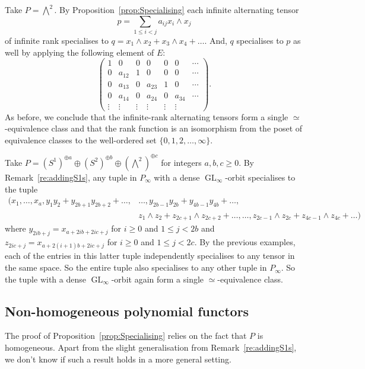 \documentclass{amsart}
\theoremstyle{plain}
\theoremstyle{definition}
\DeclareMathOperator{\GL}{GL}
\newcommand{\Wedge}{\bigwedge\nolimits}
\begin{document}
\begin{ex}\label{ex:AlternatingTensors}
Take $P=\Wedge^2$. By Proposition~\ref{prop:Specialising} each infinite alternating tensor
\[
p=\sum_{1 \leq i < j} a_{ij} x_i\land x_j
\]
of infinite rank specialises to $q=x_1\land x_2 + x_3\land x_4 + \ldots$. And, $q$ specialises to $p$ as well by applying the following element of $E$:
\[
\begin{pmatrix}
1 & 0 & 0 & 0      & 0 & 0 & \cdots\\
0 & a_{12} & 1 & 0 & 0 & 0 & \cdots\\
0 & a_{13} & 0 & a_{23} & 1 & 0 &\cdots\\
0 & a_{14} & 0 & a_{24} & 0 & a_{34} &\cdots\\
\vdots & \vdots & \vdots & \vdots & \vdots & \vdots &
\end{pmatrix}.
\]
As before, we conclude that the infinite-rank alternating
tensors form a single $\simeq$-equivalence class and that the rank function is an isomorphism from the poset of equivalence classes to the well-ordered set $\{0,1,2,\ldots,\infty\}$.
\end{ex}

\begin{ex}\label{ex:degreeleq2}
Take $P=(S^1)^{\oplus a}\oplus (S^2)^{\oplus b}\oplus (\Wedge^2)^{\oplus c}$ for integers $a,b,c\geq0$. By Remark~\ref{re:addingS1s}, any tuple in $P_{\infty}$ with a dense $\GL_{\infty}$-orbit specialises to the tuple
\begin{align*}
(x_1,\ldots,x_a,y_1y_2+y_{2b+1}y_{2b+2}+\ldots,&\ldots,y_{2b-1}y_{2b}+y_{4b-1}y_{4b}+\ldots,\\
&z_1\land z_2+z_{2c+1}\land z_{2c+2}+\ldots,\ldots,z_{2c-1}\land z_{2c}+z_{4c-1}\land z_{4c}+\ldots)
\end{align*}
where $y_{2ib+j}=x_{a+2ib+2ic+j}$ for $i\geq0$ and $1\leq
j<2b$ and $z_{2ic+j}=x_{a+2(i+1)b+2ic+j}$ for $i\geq0$ and
$1\leq j<2c$. By the previous examples, each of the entries
in this latter tuple independently specialises to any tensor
in the same space. So the entire tuple also specialises to
any other tuple in $P_{\infty}$. So the tuple with a dense
$\GL_{\infty}$-orbit again form a single
$\simeq$-equivalence class.
\end{ex}

\subsection{Non-homogeneous polynomial functors}
The proof of Proposition~\ref{prop:Specialising} relies on the fact that $P$ is homogeneous. Apart from the slight generalisation from Remark~\ref{re:addingS1s}, we don't know if such a result holds in a more general setting.
\end{document}
